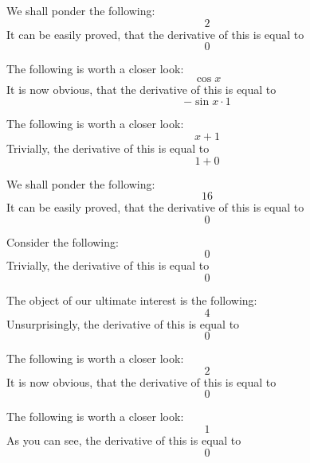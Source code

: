 \documentclass{article}
\begin{document}
We shall ponder the following:
\begin{equation}
2 
\end{equation}
It can be easily proved, that the derivative of this is equal to
\begin{equation}
0 
\end{equation}

The following is worth a closer look:
\begin{equation}
\cos x 
\end{equation}
It is now obvious, that the derivative of this is equal to
\begin{equation}
-\sin x \cdot 1 
\end{equation}

The following is worth a closer look:
\begin{equation}
x + 1 
\end{equation}
Trivially, the derivative of this is equal to
\begin{equation}
1 + 0 
\end{equation}

We shall ponder the following:
\begin{equation}
16 
\end{equation}
It can be easily proved, that the derivative of this is equal to
\begin{equation}
0 
\end{equation}

Consider the following:
\begin{equation}
0 
\end{equation}
Trivially, the derivative of this is equal to
\begin{equation}
0 
\end{equation}

The object of our ultimate interest is the following:
\begin{equation}
4 
\end{equation}
Unsurprisingly, the derivative of this is equal to
\begin{equation}
0 
\end{equation}

The following is worth a closer look:
\begin{equation}
2 
\end{equation}
It is now obvious, that the derivative of this is equal to
\begin{equation}
0 
\end{equation}

The following is worth a closer look:
\begin{equation}
1 
\end{equation}
As you can see, the derivative of this is equal to
\begin{equation}
0 
\end{equation}
\end{document}
